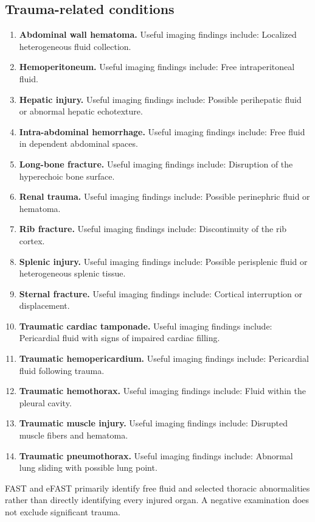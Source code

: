 \subsection{Trauma-related conditions}
\begin{enumerate}[leftmargin=*,itemsep=0.45em,topsep=0.4em]
\item \textbf{Abdominal wall hematoma.} Useful imaging findings include: Localized heterogeneous fluid collection.
\item \textbf{Hemoperitoneum.} Useful imaging findings include: Free intraperitoneal fluid.
\item \textbf{Hepatic injury.} Useful imaging findings include: Possible perihepatic fluid or abnormal hepatic echotexture.
\item \textbf{Intra-abdominal hemorrhage.} Useful imaging findings include: Free fluid in dependent abdominal spaces.
\item \textbf{Long-bone fracture.} Useful imaging findings include: Disruption of the hyperechoic bone surface.
\item \textbf{Renal trauma.} Useful imaging findings include: Possible perinephric fluid or hematoma.
\item \textbf{Rib fracture.} Useful imaging findings include: Discontinuity of the rib cortex.
\item \textbf{Splenic injury.} Useful imaging findings include: Possible perisplenic fluid or heterogeneous splenic tissue.
\item \textbf{Sternal fracture.} Useful imaging findings include: Cortical interruption or displacement.
\item \textbf{Traumatic cardiac tamponade.} Useful imaging findings include: Pericardial fluid with signs of impaired cardiac filling.
\item \textbf{Traumatic hemopericardium.} Useful imaging findings include: Pericardial fluid following trauma.
\item \textbf{Traumatic hemothorax.} Useful imaging findings include: Fluid within the pleural cavity.
\item \textbf{Traumatic muscle injury.} Useful imaging findings include: Disrupted muscle fibers and hematoma.
\item \textbf{Traumatic pneumothorax.} Useful imaging findings include: Abnormal lung sliding with possible lung point.
\end{enumerate}
FAST and eFAST primarily identify free fluid and selected thoracic abnormalities rather than directly identifying every injured organ. A negative examination does not exclude significant trauma.

